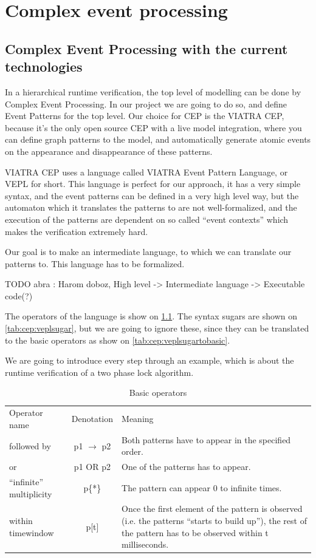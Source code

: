 \chapter{Complex event processing}
	\label{chap:cep}
	\section{Complex Event Processing with the current technologies}
		In a hierarchical runtime verification, the top level of modelling can be done by Complex Event Processing.
		In our project we are going to do so, and define Event Patterns for the top level.
		Our choice for CEP is the VIATRA CEP, because it's the only open source CEP with 
		a live model integration, where you can define graph patterns to the model, and automatically generate atomic events
		on the appearance and disappearance of these patterns.
		
		VIATRA CEP uses a language called VIATRA Event Pattern Language, or VEPL for short.
		This language is perfect for our approach, it has a very simple syntax, and the event patterns can be defined in
		a very high level way, but the automaton which it translates the patterns to are not well-formalized, and the
		execution of the patterns are dependent on so called ``event contexts'' which makes the verification extremely hard.
		
		Our goal is to make an intermediate language, to which we can translate our patterns to. This language has to be 
		formalized.
		
		TODO abra : Harom doboz, High level -> Intermediate language -> Executable code(?) 

		The operators of the language is show on \cref{tab:cep:veplop}. The syntax sugars are shown on \cref{tab:cep:veplsugar},
		but we are going to ignore these, since they can be translated to the basic operators as show on \cref{tab:cep:veplsugartobasic}.
		
		We are going to introduce every step through an example, which is about the runtime verification of a two phase lock algorithm.
		
		
		
			
		\begin{table}
		\caption{Basic operators}		
		\label{tab:cep:veplop}
		\begin{tabular}{lcm{6cm}}
		\centering
		Operator name &	Denotation & Meaning \\
		followed by & p1 $\rightarrow$ p2 & Both patterns have to appear in the specified order. \\
		or &	p1 OR p2 &	One of the patterns has to appear. \\
		``infinite'' multiplicity &	p\{*\} &	The pattern can appear 0 to infinite times. \\
		within timewindow &	p[t] &	Once the first element of the pattern is observed (i.e. the patterns ``starts to build up''), the rest of the pattern has to be observed within t milliseconds.
		\end{tabular}
		\end{table}

